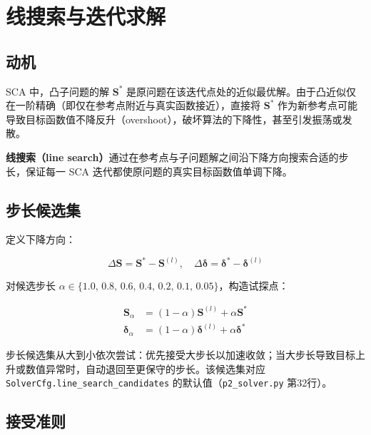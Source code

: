 \section{线搜索与迭代求解}
\label{sec:line_search}

\subsection{动机}

SCA 中，凸子问题的解 $\mathbf{S}^*$ 是原问题在该迭代点处的近似最优解。由于凸近似仅在一阶精确（即仅在参考点附近与真实函数接近），直接将 $\mathbf{S}^*$ 作为新参考点可能导致目标函数值不降反升（overshoot），破坏算法的下降性，甚至引发振荡或发散。

\textbf{线搜索（line search）}通过在参考点与子问题解之间沿下降方向搜索合适的步长，保证每一 SCA 迭代都使原问题的真实目标函数值单调下降。

\subsection{步长候选集}

定义下降方向：

\begin{equation}
\Delta\mathbf{S}=\mathbf{S}^*-\mathbf{S}^{(l)},\quad
\Delta\bm{\delta}=\bm{\delta}^*-\bm{\delta}^{(l)}
\label{eq:descent_direction}
\end{equation}

对候选步长 $\alpha\in\{1.0,\,0.8,\,0.6,\,0.4,\,0.2,\,0.1,\,0.05\}$，构造试探点：

\begin{align}
\mathbf{S}_{\alpha}&=(1-\alpha)\mathbf{S}^{(l)}+\alpha\mathbf{S}^*
\label{eq:line_search_S}\\
\bm{\delta}_{\alpha}&=(1-\alpha)\bm{\delta}^{(l)}+\alpha\bm{\delta}^*
\label{eq:line_search_delta}
\end{align}

步长候选集从大到小依次尝试：优先接受大步长以加速收敛；当大步长导致目标上升或数值异常时，自动退回至更保守的步长。该候选集对应 \texttt{SolverCfg.line\_search\_candidates} 的默认值（\texttt{p2\_solver.py} 第32行）。

\subsection{接受准则}

